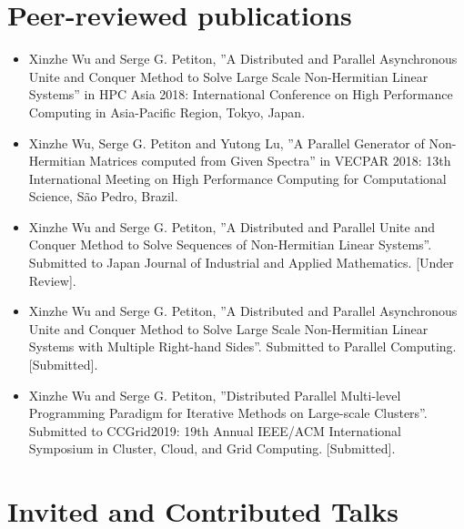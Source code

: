 \section*{Peer-reviewed publications}

\begin{itemize}
	\item Xinzhe Wu and Serge G. Petiton, ”A Distributed and Parallel Asynchronous Unite and Conquer Method to Solve Large Scale Non-Hermitian Linear Systems” in HPC Asia 2018: International Conference on High Performance Computing in Asia-Pacific Region, Tokyo, Japan. 
	\item Xinzhe Wu, Serge G. Petiton and Yutong Lu, ”A Parallel Generator of Non-Hermitian Matrices computed from Given Spectra” in VECPAR 2018: 13th International Meeting on High Performance Computing for Computational Science, S\~ao Pedro, Brazil.
	\item Xinzhe Wu and Serge G. Petiton, ”A Distributed and Parallel Unite and Conquer Method to Solve Sequences of Non-Hermitian Linear Systems”. Submitted to Japan Journal of Industrial and Applied Mathematics. [Under Review].
	\item Xinzhe Wu and Serge G. Petiton, ”A Distributed and Parallel Asynchronous Unite and Conquer Method to Solve Large Scale Non-Hermitian Linear Systems with Multiple Right-hand Sides”. Submitted to Parallel Computing. [Submitted].
	\item Xinzhe Wu and Serge G. Petiton, ”Distributed Parallel Multi-level Programming Paradigm for Iterative Methods on Large-scale Clusters”. Submitted to CCGrid2019: 19th Annual IEEE/ACM International Symposium in Cluster, Cloud, and Grid Computing. [Submitted].
\end{itemize}

\section*{Invited and Contributed Talks}

